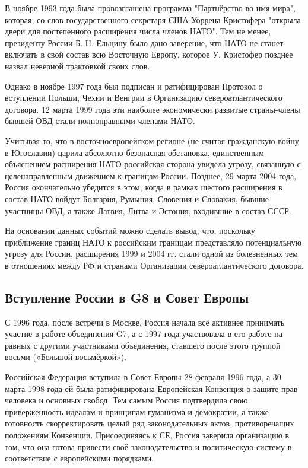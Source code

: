 В ноябре 1993 года была провозглашена программа "Партнёрство во имя мира", которая, со слов государственного секретаря США Уоррена Кристофера "открыла двери для постепенного расширения числа членов НАТО". Тем не менее, президенту России Б. Н. Ельцину было дано заверение, что НАТО не станет включать в свой состав всю Восточную Европу, которое У. Кристофер позднее назвал неверной трактовкой своих слов. 

Однако в ноябре 1997 года был подписан и ратифицирован Протокол о вступлении Польши, Чехии и Венгрии в Организацию североатлантического договора. 12 марта 1999 года эти наиболее экономически развитые страны-члены бывшей ОВД стали полноправными членами НАТО.

Учитывая то, что в восточноевропейском регионе (не считая гражданскую войну в Югославии) царила абсолютно безопасная обстановка, единственным объяснением расширения НАТО российская сторона увидела угрозу, связанную с целенаправленным движением к границам России. Позднее, 29 марта 2004 года, Россия окончательно убедится в этом, когда в рамках шестого расширения в состав НАТО войдут Болгария, Румыния, Словения и Словакия, бывшие участницы ОВД, а также Латвия, Литва и Эстония, входившие в состав СССР.

На основании данных событий можно сделать вывод, что, поскольку приближение границ НАТО к российским границам представляло потенциальную угрозу для России, расширения 1999 и 2004 гг. стали одной из болезненных тем в отношениях между РФ и странами Организации североатлантического договора.
\subsection{Вступление России в G8 и Совет Европы}
С 1996 года, после встречи в Москве, Россия начала всё активнее принимать участие в работе объединения G7, а с 1997 года участвовала в его работе на равных с другими участниками объединения, ставшего после этого группой восьми («Большой восьмёркой»).

Российская Федерация вступила в Совет Европы 28 февраля 1996 года, а 30 марта 1998 года ей была ратифицирована Европейская Конвенция о защите прав человека и основных свобод. Тем самым Россия подтвердила свою приверженность идеалам и принципам гуманизма и демократии, а также готовность скорректировать целый ряд законодательных актов, противоречащих положениям Конвенции. Присоединяясь к СЕ, Россия заверила организацию в том, что она готова привести своё законодательство и политическую систему в соответствие с европейскими порядками.
